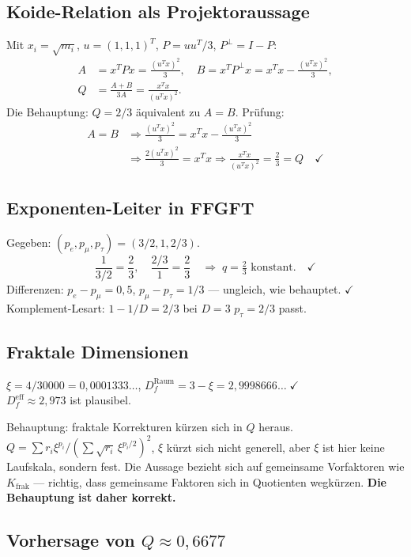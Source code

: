 \subsection{Koide-Relation als Projektoraussage}

Mit $x_i=\sqrt{m_i}$, $u=(1,1,1)^T$, $P=uu^T/3$, $P^\perp=I-P$:
\begin{align*}
  A &= x^TPx = \frac{(u^Tx)^2}{3}, \quad
  B = x^TP^\perp x = x^Tx-\frac{(u^Tx)^2}{3}, \\
  Q &= \frac{A+B}{3A} = \frac{x^Tx}{(u^Tx)^2}.
\end{align*}
Die Behauptung: $Q=2/3$ äquivalent zu $A=B$. Prüfung:
\begin{align*}
  A=B &\Rightarrow \frac{(u^Tx)^2}{3}=x^Tx-\frac{(u^Tx)^2}{3} \\
  &\Rightarrow \frac{2(u^Tx)^2}{3}=x^Tx
  \Rightarrow \frac{x^Tx}{(u^Tx)^2}=\frac{2}{3}=Q \quad\checkmark
\end{align*}

\subsection{Exponenten-Leiter in FFGFT}

Gegeben: $(p_e,p_\mu,p_\tau)=(3/2,1,2/3)$.
\[
  \frac{1}{3/2}=\frac{2}{3}, \quad \frac{2/3}{1}=\frac{2}{3}
  \quad\Rightarrow\; q=\tfrac{2}{3}\text{ konstant.}\quad\checkmark
\]
Differenzen: $p_e-p_\mu=0{,}5$, $p_\mu-p_\tau=1/3$ — ungleich, wie behauptet. $\checkmark$\\
Komplement-Lesart: $1-1/D=2/3$ bei $D=3$ \textrightarrow{} $p_\tau=2/3$ passt.

\subsection{Fraktale Dimensionen}

$\xi=4/30000=0{,}0001333\ldots$,
$D_f^{\text{Raum}}=3-\xi=2{,}9998666\ldots\;\checkmark$\\
$D_f^{\text{eff}}\approx2{,}973$ ist plausibel.

Behauptung: fraktale Korrekturen kürzen sich in $Q$ heraus.
$Q=\sum r_i\xi^{p_i}/(\sum\sqrt{r_i}\,\xi^{p_i/2})^2$,
$\xi$ kürzt sich nicht generell, aber $\xi$ ist hier keine Laufskala, sondern fest.
Die Aussage bezieht sich auf gemeinsame Vorfaktoren wie $K_{\text{frak}}$ —
richtig, dass gemeinsame Faktoren sich in Quotienten wegkürzen.
\textbf{Die Behauptung ist daher korrekt.}

\subsection{Vorhersage von $Q\approx0{,}6677$}

